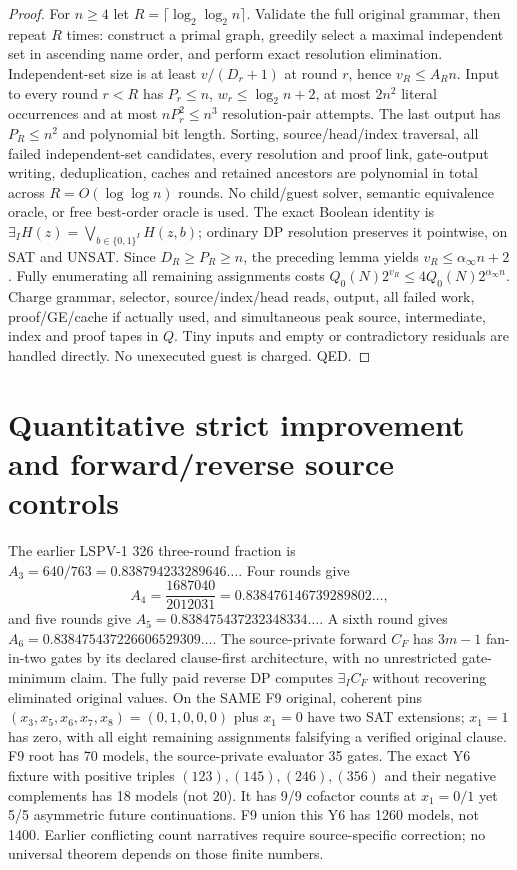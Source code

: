 \documentclass[11pt]{article}
\begin{document}
\begin{proof}
For $n\ge4$ let $R=\lceil\log_2\log_2 n\rceil$. Validate the full original grammar, then repeat $R$ times: construct a primal graph, greedily select a maximal independent set in ascending name order, and perform exact resolution elimination. Independent-set size is at least $v/(D_r+1)$ at round $r$, hence $v_R\le A_R n$. Input to every round $r<R$ has $P_r\le n$, $w_r\le\log_2n+2$, at most $2n^2$ literal occurrences and at most $nP_r^2\le n^3$ resolution-pair attempts. The last output has $P_R\le n^2$ and polynomial bit length. Sorting, source/head/index traversal, all failed independent-set candidates, every resolution and proof link, gate-output writing, deduplication, caches and retained ancestors are polynomial in total across $R=O(\log\log n)$ rounds. No child/guest solver, semantic equivalence oracle, or free best-order oracle is used. The exact Boolean identity is
$\exists_I H(z)=\bigvee_{b\in\{0,1\}^I}H(z,b)$;
ordinary DP resolution preserves it pointwise, on SAT and UNSAT.
Since $D_R\ge P_R\ge n$, the preceding lemma yields $v_R\le\alpha_\infty n+2$. Fully enumerating all remaining assignments costs $Q_0(N)2^{v_R}\le4Q_0(N)2^{\alpha_\infty n}$. Charge grammar, selector, source/index/head reads, output, all failed work, proof/GE/cache if actually used, and simultaneous peak source, intermediate, index and proof tapes in $Q$. Tiny inputs and empty or contradictory residuals are handled directly. No unexecuted guest is charged. QED.
\end{proof}

\section{Quantitative strict improvement and forward/reverse source controls}
The earlier LSPV-1 326 three-round fraction is $A_3=640/763=0.838794233289646\ldots$.
Four rounds give
\[
\boxed{A_4=\frac{1687040}{2012031}=0.838476146739289802\ldots},
\]
and five rounds give $A_5=0.838475437232348334\ldots$. A sixth round gives
$A_6=0.838475437226606529309\ldots$.
The source-private forward $C_F$ has $3m-1$ fan-in-two gates by its declared clause-first architecture, with no unrestricted gate-minimum claim. The fully paid reverse DP computes $\exists_I C_F$ without recovering eliminated original values.
On the SAME F9 original, coherent pins $(x_3,x_5,x_6,x_7,x_8)=(0,1,0,0,0)$ plus $x_1=0$ have two SAT extensions; $x_1=1$ has zero, with all eight remaining assignments falsifying a verified original clause. F9 root has 70 models, the source-private evaluator 35 gates.
The exact Y6 fixture with positive triples $(123),(145),(246),(356)$ and their negative complements has 18 models (not 20). It has 9/9 cofactor counts at $x_1=0/1$ yet 5/5 asymmetric future continuations. F9 union this Y6 has 1260 models, not 1400. Earlier conflicting count narratives require source-specific correction; no universal theorem depends on those finite numbers.
\end{document}
